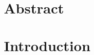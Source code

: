 \documentclass[12pt,letterpaper]{article}
\begin{document}
\vspace*{0.35in}

\begin{flushleft}
{\Large
\textbf{}
}
\newline
\\

\end{flushleft}

\section*{Abstract}


\section{Introduction}
\end{document}
